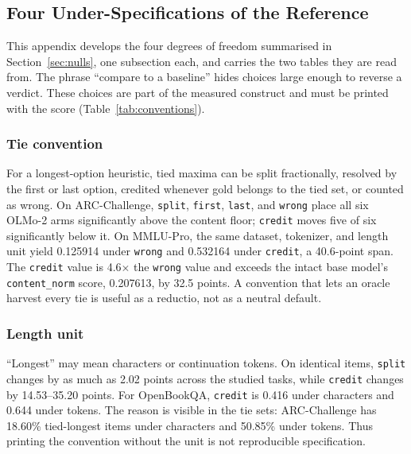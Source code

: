 \subsection{Four Under-Specifications of the Reference}
\label{app:nulls}

This appendix develops the four degrees of freedom summarised in Section~\ref{sec:nulls}, one subsection each, and carries the two tables they are read from. The phrase ``compare to a baseline'' hides choices large enough to reverse a verdict. These choices are part of the measured construct and must be printed with the score (Table~\ref{tab:conventions}).

\subsubsection{Tie convention}

For a longest-option heuristic, tied maxima can be split fractionally, resolved by the first or last option, credited whenever gold belongs to the tied set, or counted as wrong. On ARC-Challenge, \texttt{split}, \texttt{first}, \texttt{last}, and \texttt{wrong} place all six OLMo-2 arms significantly above the content floor; \texttt{credit} moves five of six significantly below it. On MMLU-Pro, the same dataset, tokenizer, and length unit yield 0.125914 under \texttt{wrong} and 0.532164 under \texttt{credit}, a 40.6-point span. The \texttt{credit} value is 4.6$\times$ the \texttt{wrong} value and exceeds the intact base model's \texttt{content\_norm} score, 0.207613, by 32.5 points. A convention that lets an oracle harvest every tie is useful as a reductio, not as a neutral default.

\subsubsection{Length unit}

``Longest'' may mean characters or continuation tokens. On identical items, \texttt{split} changes by as much as 2.02 points across the studied tasks, while \texttt{credit} changes by 14.53--35.20 points. For OpenBookQA, \texttt{credit} is 0.416 under characters and 0.644 under tokens. The reason is visible in the tie sets: ARC-Challenge has 18.60\% tied-longest items under characters and 50.85\% under tokens. Thus printing the convention without the unit is not reproducible specification.

